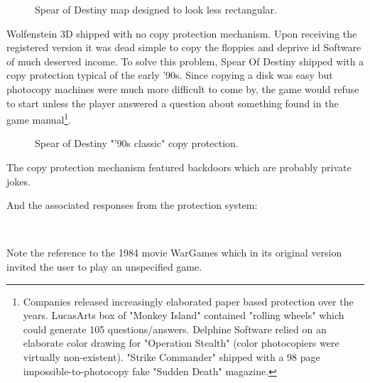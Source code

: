 \documentclass[book.tex]{subfiles}
\begin{document}
   \par
\begin{figure}[H]
\centering
 \caption{Spear of Destiny map designed to look less rectangular.}
 \end{figure}
 \par
\vspace{-10pt}
Wolfenstein 3D shipped with no copy protection mechanism. Upon receiving the registered version it was dead simple to copy the floppies and deprive id Software of much deserved income. To solve this problem, Spear Of Destiny shipped with a copy protection typical of the early '90s. Since copying a disk was easy but photocopy machines were much more difficult to come by, the game would refuse to start unless the player answered a question about something found in the game manual\footnote{Companies released increasingly elaborated paper based protection over the years. LucasArts box of "Monkey Island" contained "rolling wheels" which could generate 105 questions/answers. Delphine Software relied on an elaborate color drawing for "Operation Stealth" (color photocopiers were virtually non-existent). "Strike Commander" shipped with a 98 page impossible-to-photocopy fake "Sudden Death" magazine.}.
    
\begin{figure}[H]
\centering
 \caption{Spear of Destiny "'90s classic" copy protection.}
 \end{figure}
 \par
 The copy protection mechanism featured backdoors which are probably private jokes.\\
\par
\begin{minipage}{\textwidth}

\end{minipage}
\par
And the associated responses from the protection system:


\begin{minipage}{\textwidth}

\end{minipage}\\
\par
Note the reference to the 1984 movie WarGames which in its original version invited the user to play an unspecified game.
    \par
\begin{figure}[H]
\centering
 \end{figure}
 \par
\end{document}

